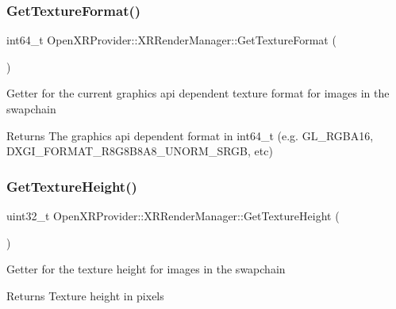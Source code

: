 \subsubsection{\texorpdfstring{GetTextureFormat()}{GetTextureFormat()}}
{\footnotesize\ttfamily int64\+\_\+t Open\+X\+R\+Provider\+::\+X\+R\+Render\+Manager\+::\+Get\+Texture\+Format (\begin{DoxyParamCaption}{ }\end{DoxyParamCaption})\hspace{0.3cm}{\ttfamily [inline]}}

Getter for the current graphics api dependent texture format for images in the swapchain \begin{DoxyReturn}{Returns}
The graphics api dependent format in int64\+\_\+t (e.\+g. G\+L\+\_\+\+R\+G\+B\+A16, D\+X\+G\+I\+\_\+\+F\+O\+R\+M\+A\+T\+\_\+\+R8\+G8\+B8\+A8\+\_\+\+U\+N\+O\+R\+M\+\_\+\+S\+R\+GB, etc) 
\end{DoxyReturn}
\mbox{\label{class_open_x_r_provider_1_1_x_r_render_manager_ae019694eb7b728af00f29eb09872a763}} 
\subsubsection{\texorpdfstring{GetTextureHeight()}{GetTextureHeight()}}
{\footnotesize\ttfamily uint32\+\_\+t Open\+X\+R\+Provider\+::\+X\+R\+Render\+Manager\+::\+Get\+Texture\+Height (\begin{DoxyParamCaption}{ }\end{DoxyParamCaption})\hspace{0.3cm}{\ttfamily [inline]}}

Getter for the texture height for images in the swapchain \begin{DoxyReturn}{Returns}
Texture height in pixels 
\end{DoxyReturn}
\mbox{\label{class_open_x_r_provider_1_1_x_r_render_manager_abee521a9347693c61be94f78af0a1602}} 
